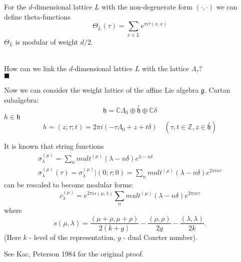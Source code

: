 \documentclass[a4paper,12pt]{article}
\newenvironment{comment}
{\par\noindent{\bf Comment}\\}
{\\\hfill$\scriptstyle\blacksquare$\par}
\theoremstyle{definition} \newtheorem{Def}{Definition}
\newcommand{\co}[1]{\overset{\circ }{#1}}
\begin{document}
For the $d$-dimensional lattice $L$ with the non-degenerate form $(\cdot,\cdot)$ we can define theta-functions
\begin{equation}
  \label{eq:8}
  \Theta_L (\tau)=\sum_{x\in L}e^{\pi i \tau (x,x)}
\end{equation}
$\Theta_L$ is modular of weight $d/2$.

\begin{comment}
  How can we link the $d$-dimensional lattice $L$ with the lattice $\Lambda_{\tau}$?
\end{comment}

Now we can consider the weight lattice of the affine Lie algebra $\mathfrak{g}$.
Cartan subalgebra:
\begin{equation}
  \label{eq:6}
  \mathfrak{h}=\mathbb{C}\Lambda_0\oplus \co{\mathfrak{h}}\oplus \mathbb{C}\delta
\end{equation}
$h\in \mathfrak{h}$
\begin{equation}
  \label{eq:7}
  h=(z;\tau;t)=2\pi i (-\tau \Lambda_0 +z + t\delta)\quad (\tau,t\in \mathbb{Z}, z\in \co{\mathfrak{h}})
\end{equation}

It is known that string functions
\begin{eqnarray}
  \label{eq:9}
  \sigma^{(\mu)}_{\lambda}=\sum_n mult^{(\mu)}(\lambda-n\delta)e^{\lambda-n\delta}\\
  \sigma^{(\mu)}_{\lambda}(\tau)=\sigma^{(\mu)}_{\lambda}|(0;\tau;0)=\sum_n mult^{(\mu)}(\lambda-n\delta)e^{2\pi i n\tau}
\end{eqnarray}
can be rescaled to become modular forms:
\begin{equation}
  \label{eq:10}
  c^{(\mu)}_{\lambda}=e^{2\pi i s(\mu,\lambda)}\sum_n mult^{(\mu)}(\lambda-n\delta)e^{2\pi i n\tau}
\end{equation}
where
\begin{equation}
  \label{eq:11}
  s(\mu,\lambda)=\frac{(\mu+\rho,\mu+\rho)}{2(k+g)}-\frac{(\rho,\rho)}{2g}-\frac{(\lambda,\lambda)}{2k}.
\end{equation}
(Here $k$ - level of the representation, $g$ - dual Coxeter number).

See Kac, Peterson 1984 for the original proof.
\end{document}

